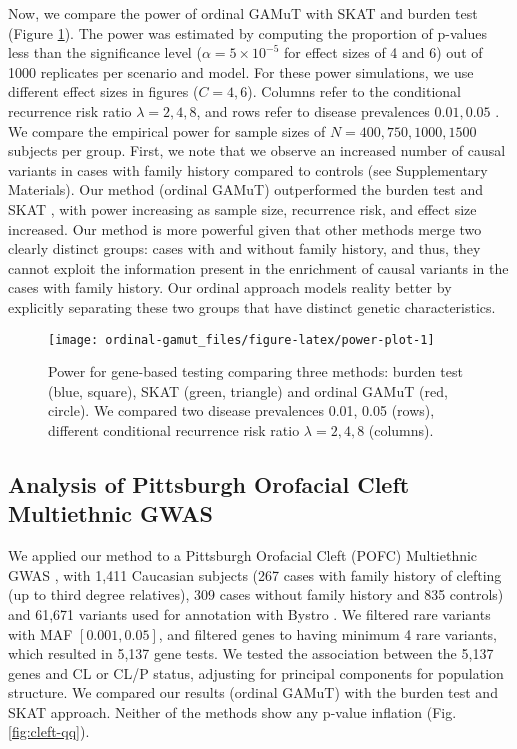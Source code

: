 \documentclass[]{article}
\theoremstyle{definition}
\theoremstyle{definition}
\theoremstyle{definition}
\theoremstyle{remark}
\begin{document}
Now, we compare the power of ordinal GAMuT with SKAT and burden test
(Figure \ref{fig:power-plot}). The power was estimated by computing the
proportion of p-values less than the significance level
(\(\alpha=5 \times 10^{-5}\) for effect sizes of 4 and 6) out of 1000
replicates per scenario and model. For these power simulations, we use
different effect sizes in figures (\(C=4,6\)). Columns refer to the
conditional recurrence risk ratio \(\lambda=2,4,8\), and rows refer to
disease prevalences \(0.01,0.05\) . We compare the empirical power for
sample sizes of \(N=400,750,1000,1500\) subjects per group. First, we
note that we observe an increased number of causal variants in cases
with family history compared to controls (see Supplementary Materials).
Our method (ordinal GAMuT) outperformed the burden test
\citep{Li2008, Madsen2009} and SKAT \citep{Wu2011}, with power
increasing as sample size, recurrence risk, and effect size increased.
Our method is more powerful given that other methods merge two clearly
distinct groups: cases with and without family history, and thus, they
cannot exploit the information present in the enrichment of causal
variants in the cases with family history. Our ordinal approach models
reality better by explicitly separating these two groups that have
distinct genetic characteristics.

\begin{figure}

{\centering \texttt{[image: ordinal-gamut\_files/figure-latex/power-plot-1]} 

}

\caption{Power for gene-based testing comparing three methods: burden test (blue, square), SKAT (green, triangle) and ordinal GAMuT (red, circle). We compared two disease prevalences 0.01, 0.05 (rows), different conditional recurrence risk ratio $\lambda=2,4,8$ (columns).}\label{fig:power-plot}
\end{figure}

\hypertarget{analysis-of-pittsburgh-orofacial-cleft-multiethnic-gwas-1}{%
\subsection{Analysis of Pittsburgh Orofacial Cleft Multiethnic
GWAS}\label{analysis-of-pittsburgh-orofacial-cleft-multiethnic-gwas-1}}

We applied our method to a Pittsburgh Orofacial Cleft (POFC) Multiethnic
GWAS \citep{Leslie2016}, \citep{Leslie2016b} with 1,411 Caucasian
subjects (267 cases with family history of clefting (up to third degree
relatives), 309 cases without family history and 835 controls) and
61,671 variants used for annotation with Bystro \citep{Kotlar2018}. We
filtered rare variants with MAF \([0.001,0.05]\), and filtered genes to
having minimum 4 rare variants, which resulted in 5,137 gene tests. We
tested the association between the 5,137 genes and CL or CL/P status,
adjusting for principal components for population structure. We compared
our results (ordinal GAMuT) with the burden test and SKAT approach.
Neither of the methods show any p-value inflation (Fig.
\ref{fig:cleft-qq}).
\end{document}
